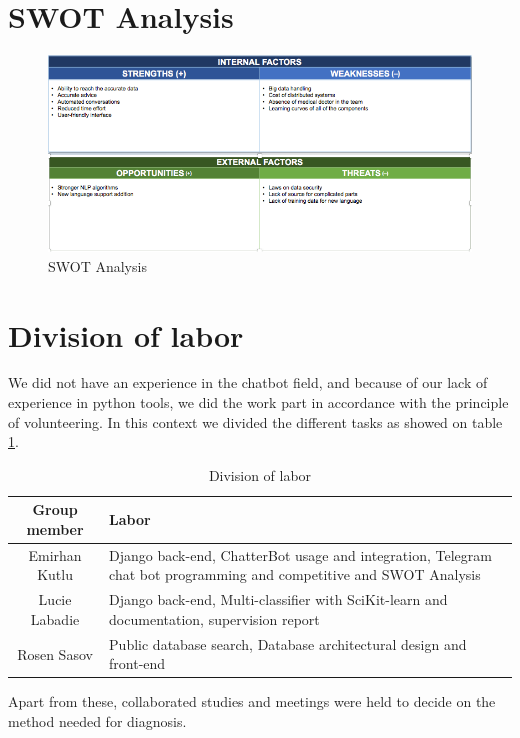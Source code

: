 \section{SWOT Analysis}

\begin{figure}[H]
	\centering
	\includegraphics[width=\textwidth]{swot}
	\caption{SWOT Analysis}
	\label{swot}
\end{figure}

\section{Division of labor}

We did not have an experience in the chatbot field, and because of our lack of experience in python	tools, we did the work part in accordance with the principle of volunteering. In this context we divided the different tasks as showed on table \ref{labor}.
\begin{table}[H]
	\centering
	\begin{tabular}{|c|p{10cm}|}
		\hline
		\textbf{Group member} & \textbf{Labor} \\
		\hline
		Emirhan	Kutlu & Django back-end, ChatterBot usage and integration, Telegram chat bot programming and competitive and SWOT Analysis \\
		\hline
		Lucie Labadie & Django back-end, Multi-classifier with SciKit-learn and documentation, supervision report \\
		\hline
		Rosen Sasov & Public database search, Database architectural design and front-end \\
		\hline
	\end{tabular}
	\caption{Division of labor}
	\label{labor}
\end{table}	

Apart from these, collaborated studies and meetings	were held to decide on the method needed for diagnosis.